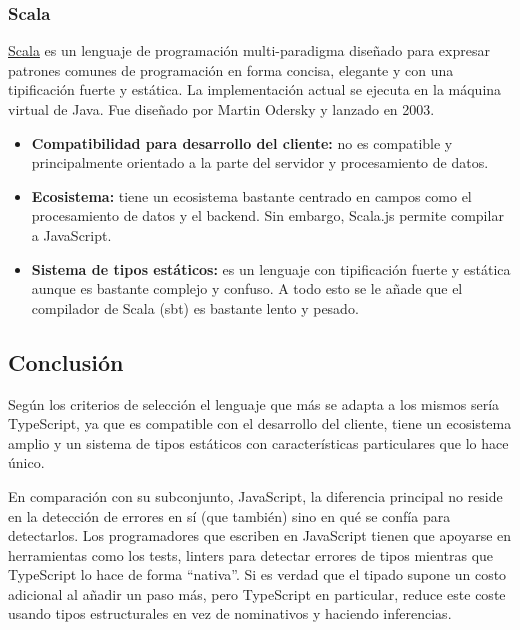 \subsubsection{Scala}

\href{https://es.wikipedia.org/w/index.php?title=Scala_(lenguaje_de_programaci%C3%B3n)&oldid=161998724}{Scala} es un lenguaje de programación multi-paradigma diseñado para expresar patrones comunes de programación en forma concisa, elegante y con una tipificación fuerte y estática. La implementación actual se ejecuta en la máquina virtual de Java. Fue diseñado por Martin Odersky y lanzado en 2003.

\begin{itemize}
    \item[\mal] \textbf{Compatibilidad para desarrollo del cliente:} no es compatible y principalmente orientado a la parte del servidor y procesamiento de datos.
    \item[\mal] \textbf{Ecosistema:} tiene un ecosistema bastante centrado en campos como el procesamiento de datos y el backend. Sin embargo, Scala.js permite compilar a JavaScript.
    \item[\regular] \textbf{Sistema de tipos estáticos:} es un lenguaje con tipificación fuerte y estática aunque es bastante complejo y confuso. A todo esto se le añade que el compilador de Scala (sbt) es bastante lento y pesado.
\end{itemize}

\subsection{Conclusión}

Según los criterios de selección el lenguaje que más se adapta a los mismos sería TypeScript, ya que es compatible con el desarrollo del cliente, tiene un ecosistema amplio y un sistema de tipos estáticos con características particulares que lo hace único.

En comparación con su subconjunto, JavaScript, la diferencia principal no reside en la detección de errores en sí (que también) sino en qué se confía para detectarlos. Los programadores que escriben en JavaScript tienen que apoyarse en herramientas como los tests, linters para detectar errores de tipos mientras que TypeScript lo hace de forma ``nativa''. Si es verdad que el tipado supone un costo adicional al añadir un paso más, pero TypeScript en particular, reduce este coste usando tipos estructurales en vez de nominativos y haciendo inferencias.

